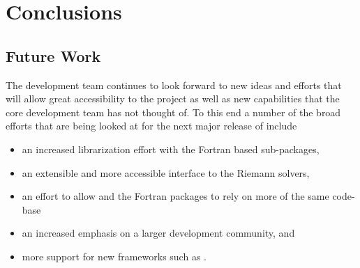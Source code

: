 %
%
%

\section{Conclusions} \label{sec:conclusions}


\subsection{Future Work} \label{sub:future}

The \clawpack development team continues to look forward to new ideas and
efforts that will allow great accessibility to the project as well as new
capabilities that the core development team has not thought of.  To this end a
number of the broad efforts that are being looked at for the next major release
of \clawpack include
\begin{itemize}
    \item an increased librarization effort with the Fortran based sub-packages,
    \item an extensible and more accessible interface to the Riemann solvers,
    \item an effort to allow \pyclaw and the \clawpack Fortran packages to rely
    on more of the same code-base
    \item an increased emphasis on a larger development community, and
    \item more support for new frameworks such as \forestclaw.
\end{itemize}